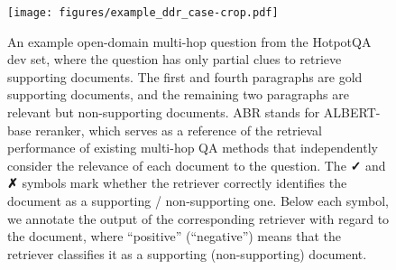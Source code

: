 \documentclass[sigconf]{acmart}
\begin{document}
\begin{figure}[t]
\center
\texttt{[image: figures/example\_ddr\_case-crop.pdf]}
\center
\caption{An example open-domain multi-hop question from the HotpotQA dev set, where the question has only partial clues to retrieve supporting documents. The first and fourth paragraphs are gold supporting documents, and the remaining two paragraphs are relevant but non-supporting documents. ABR stands for ALBERT-base reranker, which serves as a reference of the retrieval performance of existing multi-hop QA methods that independently consider the relevance of each document to the question. The \textbf{\color{greencheck}✓} and \textbf{\color{redcross}✗} symbols mark whether the retriever correctly identifies the document as a supporting / non-supporting one. Below each symbol, we annotate the output of the corresponding retriever with regard to the document, where ``positive'' (``negative'') means that the retriever classifies it as a supporting (non-supporting) document.}
\label{figure:example_of_qa_dev}
\end{figure}
\end{document}

